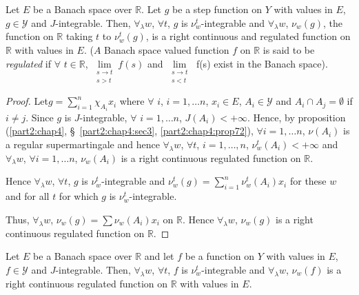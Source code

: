 \begin{proposition}\label{part2:chap4:prop74}
Let $E$ be a Banach space over $\mathbb{R}$. Let $g$ be a step
function on $Y$ with values in $E$, $g \in \mathscr{Y}$ and
$J$-integrable. Then, $\forall_\lambda w$, $\forall t $, $g$ is
$\nu^t_w$-integrable and $\forall_\lambda w$, $\nu_w(g)$, the function
on $\mathbb{R}$ taking $t$ to $\nu^t_w(g)$, is a right continuous and
regulated function on $\mathbb{R}$ with values in $E$. ($A$ Banach
space valued function $f$ on $\mathbb{R}$ is said to be {\em
  regulated} if $\forall $ $t \in\mathbb{R}$,
$\lim\limits_{\substack{s \to t\\s >t}} f(s)$ and
$\lim\limits_{\substack{s\to t\\s <t}}$ f(s) exist in the Banach
space). 
\end{proposition}

\begin{proof}
Let\pageoriginale $g = \sum\limits^n_{i =1} \chi_{A_i} x_i$ where
$\forall$ $i$, $i = 1, \ldots n$, $x_i \in E$, $A_i \in \mathscr{Y}$
and $A_i \cap A_j = \emptyset$ if $i \neq j$. Since $g$ is
$J$-integrable, $\forall$ $i = 1, \ldots n$, $J(A_i) < +
\infty$. Hence, by proposition (\ref{part2:chap4},
\S\ \ref{part2:chap4:sec3}, \ref{part2:chap4:prop72}), $\forall i = 1,
\ldots 
n$, $\nu(A_i)$ is a regular supermartingale and hence $\forall_\lambda
w$, $\forall t$, $i = 1, \ldots, n$, $\nu^t_w(A_i) < + \infty$ and
$\forall_\lambda w$, $\forall i = 1, \ldots n$, $\nu_w(A_i)$ is a
right continuous regulated function on $\mathbb{R}$. 

Hence $\forall_\lambda w$, $\forall t$, $g$ is $\nu^t_w$-integrable
and $\nu^t_w(g) = \sum\limits^n_{i=1} \nu^t_w(A_i)x_i$ for these $w$
and for all $t$ for which $g$ is $\nu^t_w$-integrable.

Thus, $\forall_\lambda w$, $\nu_w(g) = \sum \nu_w(A_i) x_i$ on
$\mathbb{R}$. Hence $\forall_\lambda w$, $\nu_w(g)$ is a right
continuous regulated function on $\mathbb{R}$. 
\end{proof}

\begin{proposition}\label{part2:chap4:prop75}
Let $E$ be a Banach space over $\mathbb{R}$ and let $f$ be a function
on $Y$ with values in $E$, $f \in \mathscr{Y}$ and
$J$-integrable. Then, $\forall_\lambda w$, $\forall t$, $f$ is
$\nu^t_w$-integrable and $\forall_\lambda w$, $\nu_w(f)$ is a right
continuous regulated function on $\mathbb{R}$ with values in $E$. 
\end{proposition}

